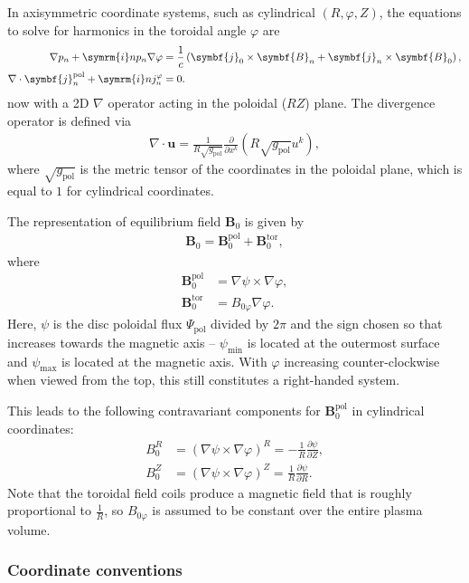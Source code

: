 \documentclass[a4paper, 10pt, english]{article}
\let\temp\varrho
\let\varrho\rho
\let\rho\temp
\let\temp\vartheta
\let\vartheta\theta
\let\theta\temp
\let\temp\varphi
\let\varphi\phi
\let\phi\temp
\let\vec\symbf
\newcommand*\im{\ensuremath{\symrm{i}}}  %
\newcommand*\pd[2][]{\ensuremath{\frac{\partial #1}{\partial #2}}}  %
\newcommand*\pol{\ensuremath{\textrm{pol}}}  %
\newcommand*\tor{\ensuremath{\textrm{tor}}}  %
\begin{document}
In axisymmetric coordinate systems, such as cylindrical $(R, \phi, Z)$, the equations to solve for harmonics in the toroidal angle $\phi$ are
\begin{align}
  \nabla p_{n} + \im n p_{n} \nabla \phi &= \frac{1}{c} \left( \vec{j}_{0} \times \vec{B}_{n} + \vec{j}_{n} \times \vec{B}_{0} \right), \label{eq:mhd-phi} \\
  \nabla \cdot \vec{j}_{n}^{\pol}+ \im n j_{n}^{\phi} &= 0. \label{eq:divfree-phi}
\end{align}
now with a 2D $\nabla$ operator acting in the poloidal ($RZ$) plane. The divergence operator is defined via
\begin{gather*}
  \nabla \cdot \vec{u} = \frac{1}{R \sqrt{g_{\pol}}} \pd{x^{k}} (R \sqrt{g_{\pol}} u^{k}),
\end{gather*}
where $\sqrt{g_{\pol}}$ is the metric tensor of the coordinates in the poloidal plane, which is equal to $1$ for cylindrical coordinates.

The representation of equilibrium field $\vec{B}_{0}$ is given by
\begin{gather}
  \vec{B}_{0} = \vec{B}_{0}^{\pol} + \vec{B}_{0}^{\tor},
\end{gather}
where 
\begin{align}
  \vec{B}_{0}^{\pol} &= \nabla \psi \times \nabla \phi, \\
  \vec{B}_{0}^{\tor} &= B_{0 \phi} \nabla \phi.
\end{align}
Here, $\psi$ is the disc poloidal flux $\Psi_{\pol}$ divided by $2 \pi$ and the sign chosen so that increases towards the magnetic axis -- $\psi_{\text{min}}$ is located at the outermost surface and $\psi_{\text{max}}$ is located at the magnetic axis. With $\phi$ increasing counter-clockwise when viewed from the top, this still constitutes a right-handed system.

This leads to the following contravariant components for $\vec{B}_{0}^{\pol}$ in cylindrical coordinates:
\begin{align}
  B_{0}^{R} &= (\nabla \psi \times \nabla \phi)^{R} = -\frac{1}{R} \pd[\psi]{Z}, \\
  B_{0}^{Z} &= (\nabla \psi \times \nabla \phi)^{Z} = \frac{1}{R} \pd[\psi]{R}.
\end{align}
Note that the toroidal field coils produce a magnetic field that is roughly proportional to $\frac{1}{R}$, so $B_{0 \phi}$ is assumed to be constant over the entire plasma volume.

\subsubsection{Coordinate conventions}
\label{sec:cocos}
\end{document}
